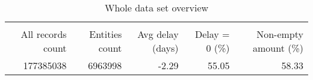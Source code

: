 \begin{table}[htbp!] \centering
\caption{Whole data set overview}
\label{tab:000_overview_whole_dataset}
\begin{tabular}{rrrrr}
\\[-1.8ex]\hline\hline \\[-1.8ex]
All records count & Entities count & Avg delay (days) & Delay = 0 (\%) & Non-empty amount (\%) \\
\midrule
177385038 & 6963998 & -2.29 & 55.05 & 58.33 \\
\bottomrule
\end{tabular}
\end{table}
